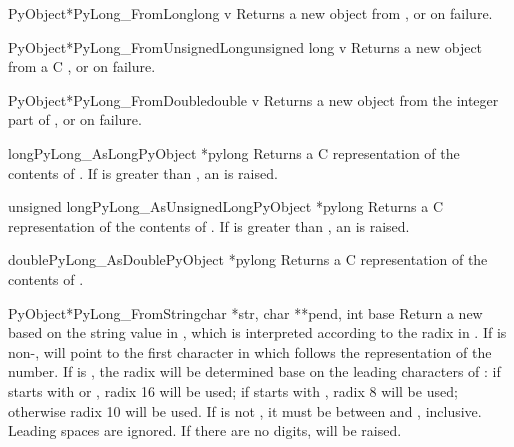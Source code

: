 \documentclass{manual}
\begin{document}
\begin{cfuncdesc}{PyObject*}{PyLong_FromLong}{long v}
Returns a new  object from , or \NULL{} on
failure.
\end{cfuncdesc}

\begin{cfuncdesc}{PyObject*}{PyLong_FromUnsignedLong}{unsigned long v}
Returns a new  object from a C , or \NULL{} on failure.
\end{cfuncdesc}

\begin{cfuncdesc}{PyObject*}{PyLong_FromDouble}{double v}
Returns a new  object from the integer part of
, or \NULL{} on failure.
\end{cfuncdesc}

\begin{cfuncdesc}{long}{PyLong_AsLong}{PyObject *pylong}
Returns a C  representation of the contents of
.  If  is greater than
, an  is
raised.
\end{cfuncdesc}

\begin{cfuncdesc}{unsigned long}{PyLong_AsUnsignedLong}{PyObject *pylong}
Returns a C  representation of the contents of 
.  If  is greater than
, an 
is raised.
\end{cfuncdesc}

\begin{cfuncdesc}{double}{PyLong_AsDouble}{PyObject *pylong}
Returns a C  representation of the contents of .
\end{cfuncdesc}

\begin{cfuncdesc}{PyObject*}{PyLong_FromString}{char *str, char **pend,
                                                int base}
Return a new  based on the string value in
, which is interpreted according to the radix in .
If  is non-\NULL,  will point to the first 
character in  which follows the representation of the
number.  If  is , the radix will be determined base
on the leading characters of : if  starts with
 or , radix 16 will be used; if  starts 
with , radix 8 will be used; otherwise radix 10 will be
used.  If  is not , it must be between  and
, inclusive.  Leading spaces are ignored.  If there are no
digits,  will be raised.
\end{cfuncdesc}
\end{document}
